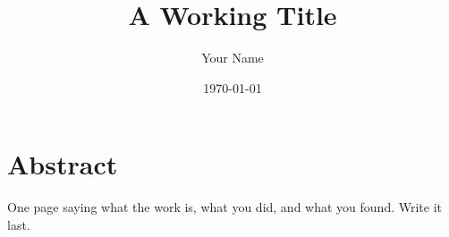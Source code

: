 \documentclass[12pt,a4paper,oneside]{memoir}
\title{A Working Title}
\author{Your Name}
\date{\today}
\begin{document}
\frontmatter
\maketitle

\chapter*{Abstract}
One page saying what the work is, what you did, and what you found.  Write
it last.

\tableofcontents

\mainmatter



\backmatter
\printbibliography
\end{document}
